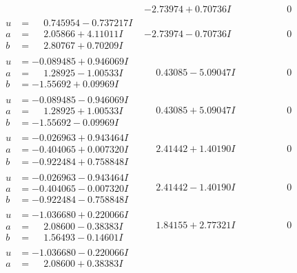 \documentclass[1p]{elsarticle_modified}
\theoremstyle{definition}
\begin{document}
$$\begin{array}{c|c|c}
 & -2.73974 + 0.70736 I & \phantom{-0.000000 } 0 \\ \hline\begin{aligned}
u &= \phantom{-}0.745954 - 0.737217 I \\
a &= \phantom{-}2.05866 + 4.11011 I \\
b &= \phantom{-}2.80767 + 0.70209 I\end{aligned}
 & -2.73974 - 0.70736 I & \phantom{-0.000000 } 0 \\ \hline\begin{aligned}
u &= -0.089485 + 0.946069 I \\
a &= \phantom{-}1.28925 - 1.00533 I \\
b &= -1.55692 + 0.09969 I\end{aligned}
 & \phantom{-}0.43085 - 5.09047 I & \phantom{-0.000000 } 0 \\ \hline\begin{aligned}
u &= -0.089485 - 0.946069 I \\
a &= \phantom{-}1.28925 + 1.00533 I \\
b &= -1.55692 - 0.09969 I\end{aligned}
 & \phantom{-}0.43085 + 5.09047 I & \phantom{-0.000000 } 0 \\ \hline\begin{aligned}
u &= -0.026963 + 0.943464 I \\
a &= -0.404065 + 0.007320 I \\
b &= -0.922484 + 0.758848 I\end{aligned}
 & \phantom{-}2.41442 + 1.40190 I & \phantom{-0.000000 } 0 \\ \hline\begin{aligned}
u &= -0.026963 - 0.943464 I \\
a &= -0.404065 - 0.007320 I \\
b &= -0.922484 - 0.758848 I\end{aligned}
 & \phantom{-}2.41442 - 1.40190 I & \phantom{-0.000000 } 0 \\ \hline\begin{aligned}
u &= -1.036680 + 0.220066 I \\
a &= \phantom{-}2.08600 - 0.38383 I \\
b &= \phantom{-}1.56493 - 0.14601 I\end{aligned}
 & \phantom{-}1.84155 + 2.77321 I & \phantom{-0.000000 } 0 \\ \hline\begin{aligned}
u &= -1.036680 - 0.220066 I \\
a &= \phantom{-}2.08600 + 0.38383 I \\

\end{aligned}
\end{array}$$
\end{document}
